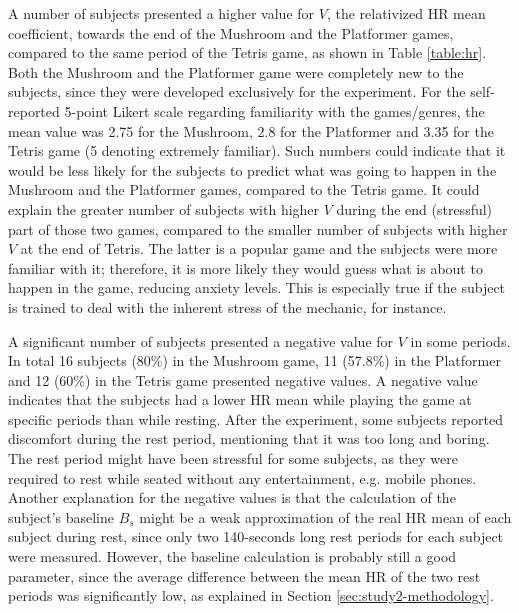 A number of subjects presented a higher value for $V$, the relativized HR mean coefficient, towards the end of the Mushroom and the Platformer games, compared to the same period of the Tetris game, as shown in Table \ref{table:hr}. Both the Mushroom and the Platformer game were completely new to the subjects, since they were developed exclusively for the experiment. For the self-reported 5-point Likert scale regarding familiarity with the games/genres, the mean value was 2.75 for the Mushroom, 2.8 for the Platformer and 3.35 for the Tetris game (5 denoting extremely familiar). Such numbers could indicate that it would be less likely for the subjects to predict what was going to happen in the Mushroom and the Platformer games, compared to the Tetris game. It could explain the greater number of subjects with higher $V$ during the end (stressful) part of those two games, compared to the smaller number of subjects with higher $V$ at the end of Tetris. The latter is a popular game and the subjects were more familiar with it; therefore, it is more likely they would guess what is about to happen in the game, reducing anxiety levels. This is especially true if the subject is trained to deal with the inherent stress of the mechanic, for instance.

A significant number of subjects presented a negative value for $V$ in some periods. In total 16 subjects (80\%) in the Mushroom game, 11 (57.8\%) in the Platformer and 12 (60\%) in the Tetris game presented negative values. A negative value indicates that the subjects had a lower HR mean while playing the game at specific periods than while resting. After the experiment, some subjects reported discomfort during the rest period, mentioning that it was too long and boring. The rest period might have been stressful for some subjects, as they were required to rest while seated without any entertainment, e.g. mobile phones. Another explanation for the negative values is that the calculation of the subject's baseline $B_s$ might be a weak approximation of the real HR mean of each subject during rest, since only two 140-seconds long rest periods for each subject were measured. However, the baseline calculation is probably still a good parameter, since the average difference between the mean HR of the two rest periods was significantly low, as explained in Section \ref{sec:study2-methodology}.

